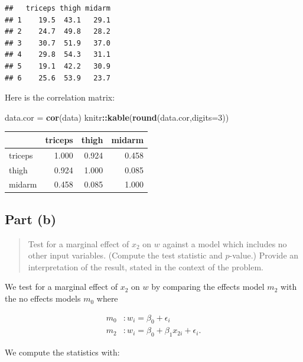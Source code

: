 \documentclass[
]{article}
\newenvironment{Shaded}{\begin{snugshade}}{\end{snugshade}}
\newcommand{\AttributeTok}[1]{\textcolor[rgb]{0.13,0.29,0.53}{#1}}
\newcommand{\DecValTok}[1]{\textcolor[rgb]{0.00,0.00,0.81}{#1}}
\newcommand{\FunctionTok}[1]{\textcolor[rgb]{0.13,0.29,0.53}{\textbf{#1}}}
\newcommand{\NormalTok}[1]{#1}
\newcommand{\OtherTok}[1]{\textcolor[rgb]{0.56,0.35,0.01}{#1}}
\newcommand{\SpecialCharTok}[1]{\textcolor[rgb]{0.81,0.36,0.00}{\textbf{#1}}}
\begin{document}
\begin{verbatim}
##   triceps thigh midarm
## 1    19.5  43.1   29.1
## 2    24.7  49.8   28.2
## 3    30.7  51.9   37.0
## 4    29.8  54.3   31.1
## 5    19.1  42.2   30.9
## 6    25.6  53.9   23.7
\end{verbatim}

Here is the correlation matrix:

\begin{Shaded}
\begin{Highlighting}[]
\NormalTok{data.cor }\OtherTok{=} \FunctionTok{cor}\NormalTok{(data)}
\NormalTok{knitr}\SpecialCharTok{::}\FunctionTok{kable}\NormalTok{(}\FunctionTok{round}\NormalTok{(data.cor,}\AttributeTok{digits=}\DecValTok{3}\NormalTok{))}
\end{Highlighting}
\end{Shaded}

\begin{longtable}[]{@{}lrrr@{}}
\toprule\noalign{}
& triceps & thigh & midarm \\
\midrule\noalign{}
\endhead
\bottomrule\noalign{}
\endlastfoot
triceps & 1.000 & 0.924 & 0.458 \\
thigh & 0.924 & 1.000 & 0.085 \\
midarm & 0.458 & 0.085 & 1.000 \\
\end{longtable}

\hypertarget{part-b}{%
\subsection{Part (b)}\label{part-b}}

\begin{quote}
Test for a marginal effect of \(x_2\) on \(w\) against a model which
includes no other input variables. (Compute the test statistic and
\(p\)-value.) Provide an interpretation of the result, stated in the
context of the problem.
\end{quote}

We test for a marginal effect of \(x_2\) on \(w\) by comparing the
effects model \(m_2\) with the no effects models \(m_0\) where

\begin{align*}
    m_0 &: w_i = \beta_0 + \epsilon_i\\
    m_2 &: w_i = \beta_0 + \beta_1 x_{2 i} + \epsilon_i.
\end{align*}

We compute the statistics with:
\end{document}
